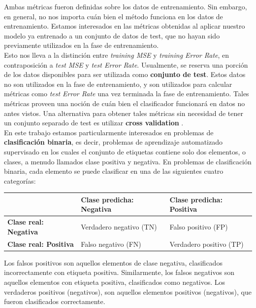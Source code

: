 Ambas métricas fueron definidas sobre los datos de entrenamiento. Sin embargo, en general, no nos importa cuán bien el método funciona en los datos de entrenamiento. Estamos interesados en las métricas obtenidas al aplicar nuestro modelo ya entrenado a un conjunto de datos de test, que no hayan sido previamente utilizados en la fase de entrenamiento. \\

Esto nos lleva a la distinción entre \textit{training MSE} y \textit{training Error Rate}, en contraposición a \textit{test MSE} y \textit{test Error Rate}. Usualmente, se reserva una porción de los datos disponibles para ser utilizada como \textbf{conjunto de test}. Estos datos no son utilizados en la fase de entrenamiento, y son utilizados para calcular métricas como \textit{test Error Rate} una vez terminada la fase de entrenamiento. Tales métricas proveen una noción de cuán bien el clasificador funcionará en datos no antes vistos. Una alternativa para obtener tales métricas sin necesidad de tener un conjunto separado de test es utilizar \textbf{cross validation} \cite{cross_validation}. \\

En este trabajo estamos particularmente interesados en problemas de \textbf{clasificación binaria}, es decir, problemas de aprendizaje automatizado supervisado en los cuales el conjunto de etiquetas contiene solo dos elementos, o clases, a menudo llamados clase positiva y negativa. En problemas de clasificación binaria, cada elemento se puede clasificar en una de las siguientes cuatro categorías: \\

\begin{table}[h!]
\begin{tabular}{l|l|l|}
\cline{2-3}
                                                    & \textbf{Clase predicha: Negativa} & \textbf{Clase predicha: Positiva} \\ \hline
\multicolumn{1}{|l|}{\textbf{Clase real: Negativa}} & Verdadero negativo (TN)           & Falso positivo (FP)               \\ \hline
\multicolumn{1}{|l|}{\textbf{Clase real: Positiva}} & Falso negativo (FN)               & Verdadero positivo (TP)           \\ \hline
\end{tabular}
\end{table}

Los falsos positivos son aquellos elementos de clase negativa, clasificados incorrectamente con etiqueta positiva. Similarmente, los falsos negativos son aquellos elementos con etiqueta positiva, clasificados como negativos. Los verdaderos positivos (negativos), son aquellos elementos positivos (negativos), que fueron clasificados correctamente. \\

